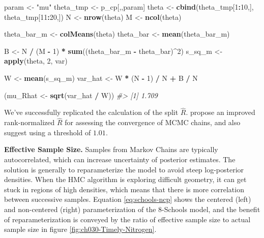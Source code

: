 \documentclass[11pt, oneside, openany]{scrbook}
\newenvironment{Shaded}{\begin{snugshade}}{\end{snugshade}}
\newcommand{\CommentTok}[1]{\textcolor[rgb]{0.56,0.35,0.01}{\textit{#1}}}
\newcommand{\DecValTok}[1]{\textcolor[rgb]{0.00,0.00,0.81}{#1}}
\newcommand{\FunctionTok}[1]{\textcolor[rgb]{0.13,0.29,0.53}{\textbf{#1}}}
\newcommand{\NormalTok}[1]{#1}
\newcommand{\OtherTok}[1]{\textcolor[rgb]{0.56,0.35,0.01}{#1}}
\newcommand{\SpecialCharTok}[1]{\textcolor[rgb]{0.81,0.36,0.00}{\textbf{#1}}}
\newcommand{\StringTok}[1]{\textcolor[rgb]{0.31,0.60,0.02}{#1}}
\begin{document}
\begin{Shaded}
\begin{Highlighting}[]
\NormalTok{param }\OtherTok{\textless{}{-}} \StringTok{"mu"}
\NormalTok{theta\_tmp }\OtherTok{\textless{}{-}}\NormalTok{ p\_cp[,,param]}
\NormalTok{theta }\OtherTok{\textless{}{-}} \FunctionTok{cbind}\NormalTok{(theta\_tmp[}\DecValTok{1}\SpecialCharTok{:}\DecValTok{10}\NormalTok{,], theta\_tmp[}\DecValTok{11}\SpecialCharTok{:}\DecValTok{20}\NormalTok{,])}
\NormalTok{N     }\OtherTok{\textless{}{-}} \FunctionTok{nrow}\NormalTok{(theta)}
\NormalTok{M     }\OtherTok{\textless{}{-}} \FunctionTok{ncol}\NormalTok{(theta)}

\NormalTok{theta\_bar\_m }\OtherTok{\textless{}{-}} \FunctionTok{colMeans}\NormalTok{(theta)}
\NormalTok{theta\_bar   }\OtherTok{\textless{}{-}} \FunctionTok{mean}\NormalTok{(theta\_bar\_m)}

\NormalTok{B }\OtherTok{\textless{}{-}}\NormalTok{ N }\SpecialCharTok{/}\NormalTok{ (M }\SpecialCharTok{{-}} \DecValTok{1}\NormalTok{) }\SpecialCharTok{*} \FunctionTok{sum}\NormalTok{((theta\_bar\_m }\SpecialCharTok{{-}}\NormalTok{ theta\_bar)}\SpecialCharTok{\^{}}\DecValTok{2}\NormalTok{)}
\NormalTok{s\_sq\_m }\OtherTok{\textless{}{-}} \FunctionTok{apply}\NormalTok{(theta, }\DecValTok{2}\NormalTok{, var)}

\NormalTok{W }\OtherTok{\textless{}{-}} \FunctionTok{mean}\NormalTok{(s\_sq\_m)}
\NormalTok{var\_hat }\OtherTok{\textless{}{-}}\NormalTok{ W }\SpecialCharTok{*}\NormalTok{ (N }\SpecialCharTok{{-}} \DecValTok{1}\NormalTok{) }\SpecialCharTok{/}\NormalTok{ N }\SpecialCharTok{+}\NormalTok{ B }\SpecialCharTok{/}\NormalTok{ N}

\NormalTok{(mu\_Rhat }\OtherTok{\textless{}{-}} \FunctionTok{sqrt}\NormalTok{(var\_hat }\SpecialCharTok{/}\NormalTok{ W))}
\CommentTok{\#\textgreater{} [1] 1.709}
\end{Highlighting}
\end{Shaded}


We've successfully replicated the calculation of the split \(\hat{R}\). \citet{vehtari2020rank} propose an improved rank-normalized \(\hat{R}\) for assessing the convergence of MCMC chains, and also suggest using a threshold of \(1.01\).

\textbf{Effective Sample Size.} Samples from Markov Chains are typically autocorrelated, which can increase uncertainty of posterior estimates. The solution is generally to reparameterize the model to avoid steep log-posterior densities. When the HMC algorithm is exploring difficult geometry, it can get stuck in regions of high densities, which means that there is more correlation between successive samples. Equation \eqref{eq:schools-ncp} shows the centered (left) and non-centered (right) parameterization of the 8-Schools model, and the benefit of reparameterization is conveyed by the ratio of effective sample size to actual sample size in figure \ref{fig:ch030-Timely-Nitrogen}.
\end{document}
